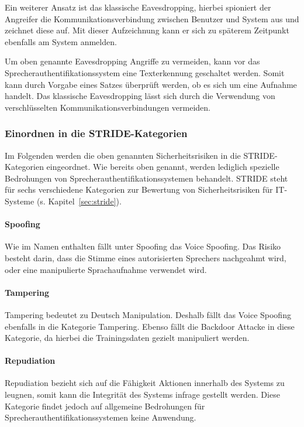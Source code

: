 Ein weiterer Ansatz ist das klassische Eavesdropping, hierbei spioniert der Angreifer die Kommunikationsverbindung zwischen Benutzer und System aus und zeichnet diese auf.
Mit dieser Aufzeichnung kann er sich zu späterem Zeitpunkt ebenfalls am System anmelden.

Um oben genannte Eavesdropping Angriffe zu vermeiden, kann vor das Sprecherauthentifikationssystem eine Texterkennung geschaltet werden.
Somit kann durch Vorgabe eines Satzes überprüft werden, ob es sich um eine Aufnahme handelt.
Das klassische Eavesdropping lässt sich durch die Verwendung von verschlüsselten Kommunikationsverbindungen vermeiden.

\subsubsection{Einordnen in die STRIDE-Kategorien}
Im Folgenden werden die oben genannten Sicherheitsrisiken in die STRIDE-Kategorien eingeordnet.
Wie bereits oben genannt, werden lediglich spezielle Bedrohungen von Sprecherauthentifikationssystemen behandelt.
STRIDE steht für sechs verschiedene Kategorien zur Bewertung von Sicherheitsrisiken für IT-Systeme (s. Kapitel~\ref{sec:stride}).
\paragraph{Spoofing}
Wie im Namen enthalten fällt unter Spoofing das Voice Spoofing.
Das Risiko besteht darin, dass die Stimme eines autorisierten Sprechers nachgeahmt wird, oder eine manipulierte Sprachaufnahme verwendet wird.

\paragraph{Tampering}
Tampering bedeutet zu Deutsch Manipulation.
Deshalb fällt das Voice Spoofing ebenfalls in die Kategorie Tampering.
Ebenso fällt die Backdoor Attacke in diese Kategorie, da hierbei die Trainingsdaten gezielt manipuliert werden.

\paragraph{Repudiation}
Repudiation bezieht sich auf die Fähigkeit Aktionen innerhalb des Systems zu leugnen, somit kann die Integrität des Systems infrage gestellt werden.
Diese Kategorie findet jedoch auf allgemeine Bedrohungen für Sprecherauthentifikationssystemen keine Anwendung.

